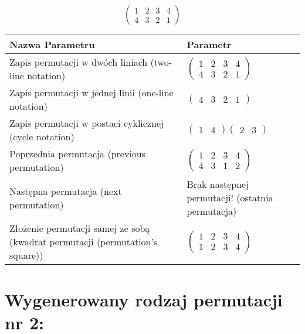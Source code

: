 \documentclass[12pt]{article}
\begin{document}
\subsection{}
\begin{center}
\[
\begin{pmatrix}
	1 & 2 & 3 & 4 \\ 
	4 & 3 & 2 & 1 
\end{pmatrix}
\]

\begin{tabular}{|m{0.6\linewidth}|m{0.4\linewidth}|}
	\hline
	Nazwa Parametru & Parametr \\
	\hline
	Zapis permutacji w dwóch liniach (two-line notation) & $\begin{pmatrix} 1 & 2 & 3 & 4 \\ 
4 & 3 & 2 & 1 \end{pmatrix}$ \\ 
	\hline
	Zapis permutacji w jednej linii (one-line notation) & $\begin{pmatrix} 4 & 3 & 2 & 1 \end{pmatrix}$ \\ 
	\hline
	Zapis permutacji w postaci cyklicznej (cycle notation) & $\begin{pmatrix} 1 & 4 \end{pmatrix} \begin{pmatrix} 2 & 3 \end{pmatrix} $ \\ 
	\hline
	Poprzednia permutacja (previous permutation) & $\begin{pmatrix} 1 & 2 & 3 & 4 \\ 
4 & 3 & 1 & 2 \end{pmatrix}$ \\ 
	\hline
	Następna permutacja (next permutation) & Brak następnej permutacji! (ostatnia permutacja)\\ 
	\hline
	Złożenie permutacji samej ze sobą (kwadrat permutacji (permutation's square)) & $\begin{pmatrix} 1 & 2 & 3 & 4 \\ 
1 & 2 & 3 & 4 \end{pmatrix}$ \\ 
	\hline
\end{tabular}
\end{center}


\section{Wygenerowany rodzaj permutacji nr 2:}
\end{document}
